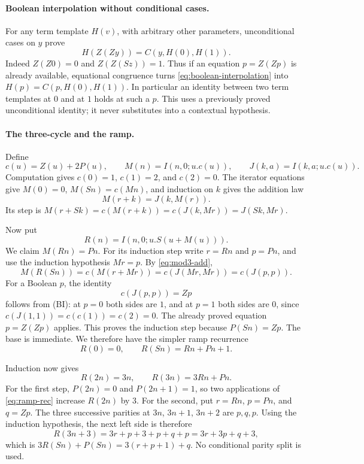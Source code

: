 \paragraph{Boolean interpolation without conditional cases.}
For any term template $H(v)$, with arbitrary other parameters, unconditional
cases on $y$ prove
\begin{equation}
 H(Z(Zy))=C(y,H(0),H(1)).
 \tag{BI}\label{eq:boolean-interpolation}
\end{equation}
Indeed $Z(Z0)=0$ and $Z(Z(Sz))=1$. Thus if an equation $p=Z(Zp)$ is
already available, equational congruence turns \eqref{eq:boolean-interpolation}
into $H(p)=C(p,H(0),H(1))$. In particular an identity between two term
templates at $0$ and at $1$ holds at such a $p$. This uses a previously proved
unconditional identity; it never substitutes into a contextual hypothesis.

\paragraph{The three-cycle and the ramp.}
Define
\[
 c(u)=Z(u)+2P(u),\qquad M(n)=I(n,0;u.c(u)),\qquad
 J(k,a)=I(k,a;u.c(u)).
\]
Computation gives $c(0)=1$, $c(1)=2$, and $c(2)=0$.
The iterator equations give $M(0)=0$, $M(Sn)=c(Mn)$, and induction on $k$
gives the addition law
\begin{equation}
 M(r+k)=J(k,M(r)).\tag{M+}\label{eq:mod3-add}
\end{equation}
Its step is $M(r+Sk)=c(M(r+k))=c(J(k,Mr))=J(Sk,Mr)$.

Now put
\[
 R(n)=I(n,0;u.S(u+M(u))).
\]
We claim $M(Rn)=Pn$. For its induction step write $r=Rn$ and $p=Pn$,
and use the induction hypothesis $Mr=p$. By \eqref{eq:mod3-add},
\[
 M(R(Sn))=c(M(r+Mr))=c(J(Mr,Mr))=c(J(p,p)).
\]
For a Boolean $p$, the identity
\[
 c(J(p,p))=Zp
\]
follows from (BI): at $p=0$ both sides are $1$, and at $p=1$ both sides
are $0$, since $c(J(1,1))=c(c(1))=c(2)=0$.
The already proved equation $p=Z(Zp)$ applies. This proves the induction
step because $P(Sn)=Zp$. The base is immediate.
We therefore have the simpler ramp recurrence
\begin{equation}
 R(0)=0,\qquad R(Sn)=Rn+Pn+1.\tag{R}\label{eq:ramp-rec}
\end{equation}

Induction now gives
\begin{equation}
 R(2n)=3n,\qquad R(3n)=3Rn+Pn.\tag{R23}\label{eq:ramp-multiples}
\end{equation}
For the first step, $P(2n)=0$ and $P(2n+1)=1$, so two applications of
\eqref{eq:ramp-rec} increase $R(2n)$ by $3$.
For the second, put $r=Rn$, $p=Pn$, and $q=Zp$.
The three successive parities at $3n$, $3n+1$, $3n+2$ are $p,q,p$.
Using the induction hypothesis, the next left side is therefore
\[
 R(3n+3)=3r+p+3+p+q+p=3r+3p+q+3,
\]
which is $3R(Sn)+P(Sn)=3(r+p+1)+q$. No conditional parity split is used.

